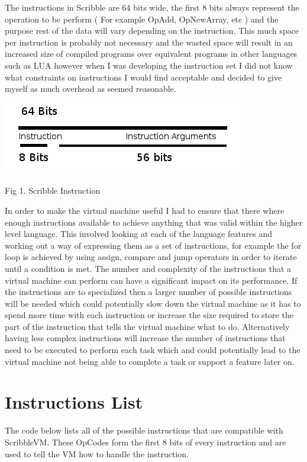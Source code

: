 \documentclass[]{final_report}
\begin{document}
The instructions in Scribble are 64 bits wide, the first 8 bits always represent the operation to be perform ( For example OpAdd, OpNewArray, etc ) and the purpose rest of the data will vary depending on the instruction. This much space per instruction is probably not necessary and the wasted space will result in an increased size of compiled programs over equivalent programs in other languages such as LUA however when I was developing the instruction set I did not know what constraints on instructions I would find acceptable and decided to give myself as much overhead as seemed reasonable.

\includegraphics{"Instruction"}


Fig 1. Scribble Instruction

In order to make the virtual machine useful I had to ensure that there where enough instructions available to achieve anything that was valid within the higher level language. This involved looking at each of the language features and working out a way of expressing them as a set of instructions, for example the for loop is achieved by using assign, compare and jump operators in order to iterate until a condition is met. The number and complexity of the instructions that a virtual machine can perform can have a significant impact on its performance. If the instructions are to specialized then a larger number of possible instructions will be needed which could potentially slow down the virtual machine as it has to spend more time with each instruction or increase the size required to store the part of the instruction that tells the virtual machine what to do. Alternatively having less complex instructions will increase the number of instructions that need to be executed to perform each task which  and could potentially lead to the virtual machine not being able to complete a task or support a feature later on.

\section{Instructions List}

The code below lists all of the possible instructions that are compatible with ScribbleVM. These OpCodes form the first 8 bits of every instruction and are used to tell the VM how to handle the instruction.
\end{document}
